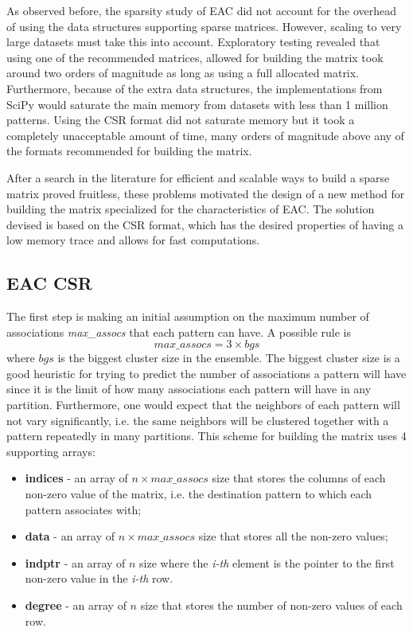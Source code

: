 As observed before, the sparsity study of EAC \cite{Lourenco2010} did not account for the overhead of using the data structures supporting sparse matrices.
However, scaling to very large datasets must take this into account.
Exploratory testing revealed that using one of the recommended matrices, allowed for building the matrix took around two orders of magnitude as long as using a full allocated matrix.
Furthermore, because of the extra data structures, the implementations from SciPy would saturate the main memory from datasets with less than 1 million patterns.
Using the CSR format did not saturate memory but it took a completely unacceptable amount of time, many orders of magnitude above any of the formats recommended for building the matrix.

After a search in the literature for efficient and scalable ways to build a sparse matrix proved fruitless, these problems motivated the design of a new method for building the matrix specialized for the characteristics of EAC.
The solution devised is based on the CSR format, which has the desired properties of having a low memory trace and allows for fast computations.

\subsection{EAC CSR}

The first step is making an initial assumption on the maximum number of associations \emph{max\_assocs} that each pattern can have.
A possible rule is $$max\_assocs = 3 \times bgs$$ where $bgs$ is the biggest cluster size in the ensemble.
The biggest cluster size is a good heuristic for trying to predict the number of associations a pattern will have since it is the limit of how many associations each pattern will have in any partition.
Furthermore, one would expect that the neighbors of each pattern will not vary significantly, i.e. the same neighbors will be clustered together with a pattern repeatedly in many partitions.
This scheme for building the matrix uses 4 supporting arrays:

\begin{itemize}
	\item \textbf{indices} - an array of $n \times max\_assocs$ size that stores the columns of each non-zero value of the matrix, i.e. the destination pattern to which each pattern associates with;
	\item \textbf{data} - an array of $n \times max\_assocs$ size that stores all the non-zero values;
	\item \textbf{indptr} - an array of $n$ size where the \emph{i-th} element is the pointer to the first non-zero value in the \emph{i-th} row.
	\item \textbf{degree} - an array of $n$ size that stores the number of non-zero values of each row.
\end{itemize}

